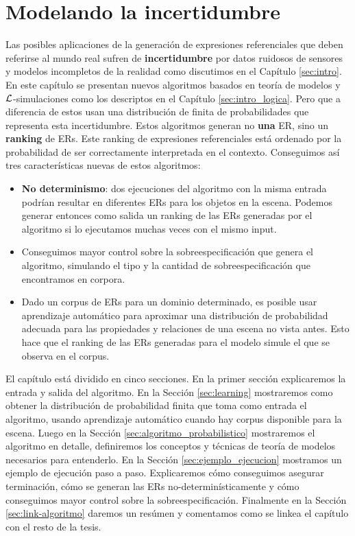\chapter{Modelando la incertidumbre}
\label{sec:algoritmo}
 Las posibles aplicaciones de la generaci\'on de expresiones referenciales que deben referirse al mundo real sufren de \textbf{incertidumbre} por datos ruidosos de sensores y modelos incompletos de la realidad como discutimos en el Cap\'itulo \ref{sec:intro}.
En este cap\'itulo se presentan nuevos algoritmos basados en teor\'ia de modelos y $\mathcal{L}$-simulaciones como los descriptos en el Cap\'itulo \ref{sec:intro_logica}. Pero que a diferencia de estos usan una distribuci\'on de finita de probabilidades que representa esta incertidumbre. Estos algoritmos generan no \textbf{una} ER, sino un \textbf{ranking} de ERs. Este ranking de expresiones referenciales est\'a ordenado por la probabilidad de ser correctamente interpretada en el contexto. 
Conseguimos as\'i tres caracter\'isticas nuevas de estos algoritmos:
\begin{itemize}
 \item \textbf{No determinismo}: dos ejecuciones del algoritmo con la
misma entrada podr\'{i}an resultar en diferentes ERs para los objetos en la escena. Podemos generar entonces como salida un ranking de las ERs generadas por el algoritmo si lo ejecutamos muchas veces con
el mismo input. 
 \item Conseguimos mayor control sobre la sobreespecificaci\'on que genera el algoritmo, simulando el tipo y la cantidad de sobreespecificaci\'on que encontramos en  corpora.
 \item Dado un corpus de ERs para un dominio determinado,
es posible usar aprendizaje autom\'atico para aproximar una distribuci\'on de probabilidad adecuada para las propiedades y relaciones de una escena no vista antes. Esto hace que el ranking de las ERs generadas para el modelo simule el que se observa en el corpus.
\end{itemize}

El cap\'itulo est\'a dividido en cinco secciones. En la primer secci\'on explicaremos la entrada y salida del algoritmo. En la Secci\'on \ref{sec:learning} mostraremos como obtener la distribuci\'on de probabilidad finita que toma como entrada el algoritmo, usando aprendizaje autom\'atico cuando hay corpus disponible para la escena. Luego en la Secci\'on \ref{sec:algoritmo_probabilistico} mostraremos el algoritmo en detalle, definiremos los conceptos y t\'ecnicas de teor\'ia de modelos necesarios para entenderlo. En la Secci\'on \ref{sec:ejemplo_ejecucion} mostramos un ejemplo de ejecuci\'on paso a paso. Explicaremos c\'omo conseguimos asegurar terminaci\'on, c\'omo se generan las ERs no-determin\'isticamente y c\'omo conseguimos mayor control sobre la sobreespecificaci\'on. Finalmente en la Secci\'on \ref{sec:link-algoritmo} daremos un res\'umen y comentamos como se linkea el cap\'itulo con el resto de la tesis.

